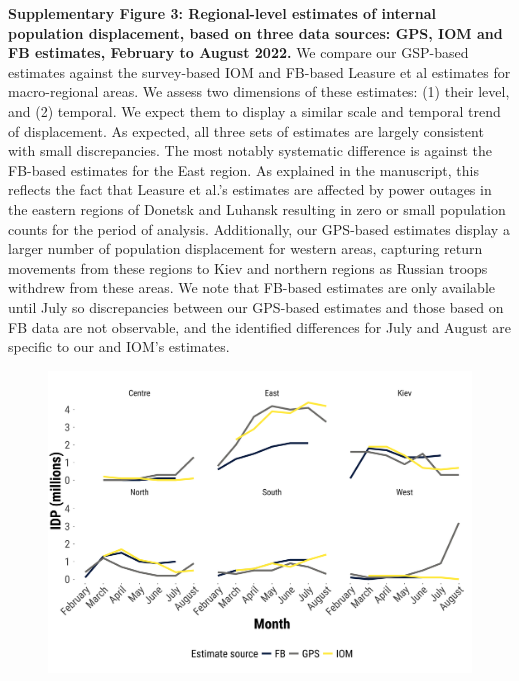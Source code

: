 \documentclass[
  11pt,
]{article}
\begin{document}
\newpage

\textbf{Supplementary Figure 3: Regional-level estimates of internal
population displacement, based on three data sources: GPS, IOM and FB
estimates, February to August 2022.} We compare our GSP-based estimates
against the survey-based IOM and FB-based Leasure et al estimates for
macro-regional areas. We assess two dimensions of these estimates: (1)
their level, and (2) temporal. We expect them to display a similar scale
and temporal trend of displacement. As expected, all three sets of
estimates are largely consistent with small discrepancies. The most
notably systematic difference is against the FB-based estimates for the
East region. As explained in the manuscript, this reflects the fact that
Leasure et al.'s estimates are affected by power outages in the eastern
regions of Donetsk and Luhansk resulting in zero or small population
counts for the period of analysis. Additionally, our GPS-based estimates
display a larger number of population displacement for western areas,
capturing return movements from these regions to Kiev and northern
regions as Russian troops withdrew from these areas. We note that
FB-based estimates are only available until July so discrepancies
between our GPS-based estimates and those based on FB data are not
observable, and the identified differences for July and August are
specific to our and IOM's estimates.

\begin{figure}[h]

\begin{minipage}{\linewidth}

\begin{center}
\includegraphics[width=5.20833in,height=\textheight]{../outputs/sm/plot_macro_region.png}
\end{center}

\end{minipage}%

\end{figure}%
\end{document}
